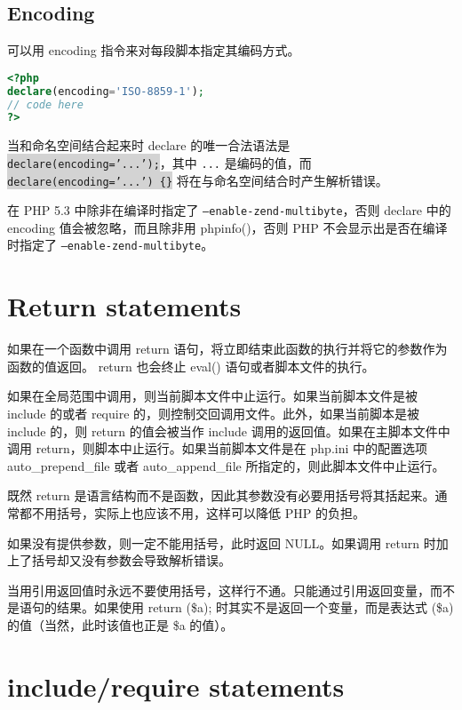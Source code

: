 \subsection{Encoding}

可以用 encoding 指令来对每段脚本指定其编码方式。


\begin{lstlisting}[language=PHP]
<?php
declare(encoding='ISO-8859-1');
// code here
?>
\end{lstlisting}



当和命名空间结合起来时 declare 的唯一合法语法是 \colorbox{lightgray}{\texttt{declare(encoding='...');}}，其中 \texttt{...} 是编码的值，而 \colorbox{lightgray}{\texttt{declare(encoding='...') \{\}}} 将在与命名空间结合时产生解析错误。

在 PHP 5.3 中除非在编译时指定了 \texttt{--enable-zend-multibyte}，否则 declare 中的 encoding 值会被忽略，而且除非用 phpinfo()，否则 PHP 不会显示出是否在编译时指定了 \texttt{--enable-zend-multibyte}。

\section{Return statements}

如果在一个函数中调用 return 语句，将立即结束此函数的执行并将它的参数作为函数的值返回。 return 也会终止 eval() 语句或者脚本文件的执行。

如果在全局范围中调用，则当前脚本文件中止运行。如果当前脚本文件是被 include 的或者 require 的，则控制交回调用文件。此外，如果当前脚本是被 include 的，则 return 的值会被当作 include 调用的返回值。如果在主脚本文件中调用 return，则脚本中止运行。如果当前脚本文件是在 php.ini 中的配置选项 auto\_prepend\_file 或者 auto\_append\_file 所指定的，则此脚本文件中止运行。

既然 return 是语言结构而不是函数，因此其参数没有必要用括号将其括起来。通常都不用括号，实际上也应该不用，这样可以降低 PHP 的负担。

如果没有提供参数，则一定不能用括号，此时返回 NULL。如果调用 return 时加上了括号却又没有参数会导致解析错误。

当用引用返回值时永远不要使用括号，这样行不通。只能通过引用返回变量，而不是语句的结果。如果使用 return (\$a); 时其实不是返回一个变量，而是表达式 (\$a) 的值（当然，此时该值也正是 \$a 的值）。



\section{include/require statements}

